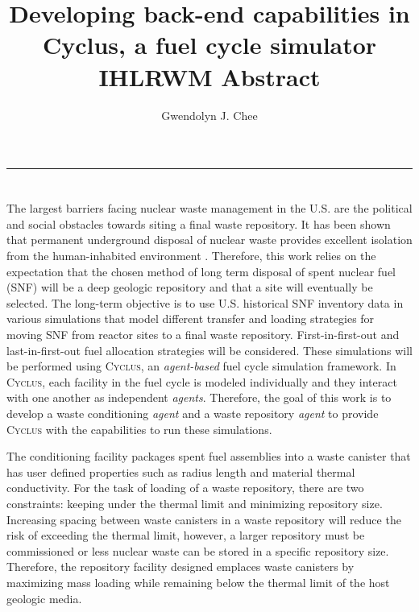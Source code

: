 \documentclass[11pt, letterpaper]{article}
\title{Developing back-end capabilities in Cyclus, a fuel cycle simulator
        \\ \vspace{0.5em} IHLRWM Abstract}
\author{Gwendolyn J. Chee}
\renewcommand *\footnoterule{}
\begin{document}
	\maketitle
	\hrule

\section * {}
\doublespacing
The largest barriers facing nuclear waste management in the U.S. 
are the political and social obstacles towards siting a final 
waste repository. 
It has been shown that permanent underground disposal of nuclear 
waste provides excellent isolation from the human-inhabited 
environment \cite{rechard_evolution_2014}. 
Therefore, this work relies on the expectation that the chosen 
method of long term disposal of spent nuclear fuel (SNF) will be 
a deep geologic repository and that a site will eventually be 
selected.
The long-term objective is to use U.S. historical SNF inventory data 
\cite{peterson_unf-st&dards_2017} in various simulations that 
model different transfer and loading strategies for moving SNF 
from reactor sites to a final waste repository. 
First-in-first-out and last-in-first-out fuel allocation 
strategies will be considered. 
These simulations will be performed using \textsc{Cyclus}, an 
\textit{agent-based} fuel cycle simulation framework. In 
\textsc{Cyclus}, each facility in the fuel cycle is modeled 
individually and they interact with one another as independent 
\textit{agents}. 
Therefore, the goal of this work is to develop a waste 
conditioning \textit{agent} and a waste repository \textit{agent} 
to provide \textsc{Cyclus} with the capabilities to run these 
simulations. 

The conditioning facility packages spent fuel assemblies into a 
waste canister that has user defined properties such as radius 
length and material thermal conductivity. 
For the task of loading of a waste repository, there are two
constraints: keeping under the thermal limit and 
minimizing repository size.
Increasing spacing between waste canisters in a waste repository
will reduce the risk of exceeding the thermal limit, however, 
a larger repository must be commissioned or less nuclear waste 
can be stored in a specific repository size. 
Therefore, the repository facility designed emplaces waste 
canisters by maximizing mass loading while remaining below 
the thermal limit of the host geologic media. 






\end{document}
